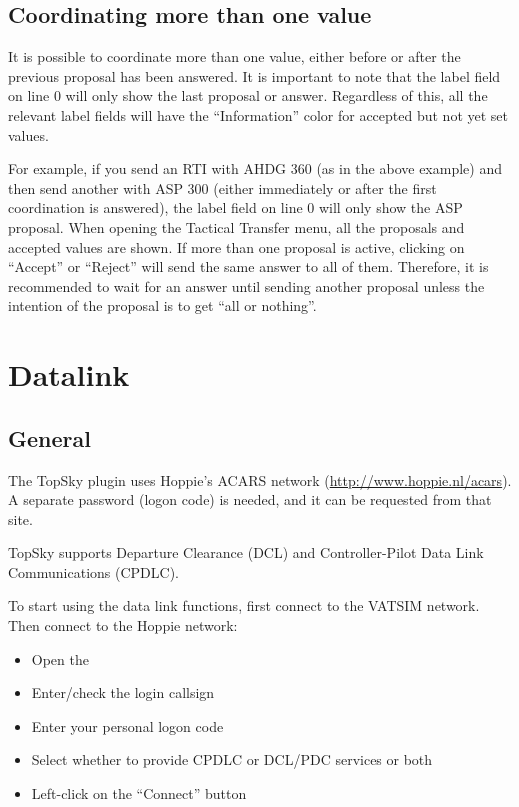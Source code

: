 \documentclass[11pt,a4paper,oldfontcommands]{memoir}
\begin{document}
\section{Coordinating more than one value}

It is possible to coordinate more than one value, either before or after the previous proposal has been answered. It is important to note that the label field on line 0 will only show the last proposal or answer. Regardless of this, all the relevant label fields will have the “Information” color for accepted but not yet set values.

For example, if you send an RTI with AHDG 360 (as in the above example) and then send another with ASP 300 (either immediately or after the first coordination is answered), the label field on line 0 will only show the ASP proposal. When opening the Tactical Transfer menu, all the proposals and accepted values are shown. If more than one proposal is active, clicking on “Accept” or “Reject” will send the same answer to all of them. Therefore, it is recommended to wait for an answer until sending another proposal unless the intention of the proposal is to get “all or nothing”.

\chapter{Datalink}

\section{General}

The TopSky plugin uses Hoppie’s ACARS network (\url{http://www.hoppie.nl/acars}). A separate password (logon code) is needed, and it can be requested from that site. 

TopSky supports Departure Clearance (DCL) and Controller-Pilot Data Link Communications (CPDLC).

To start using the data link functions, first connect to the VATSIM network. Then connect to the Hoppie network:

\begin{itemize}
  \item Open the \textit{}
  \item Enter/check the login callsign
  \item Enter your personal logon code
  \item Select whether to provide CPDLC or DCL/PDC services or both
  \item Left-click on the “Connect” button
\end{itemize}
\end{document}
